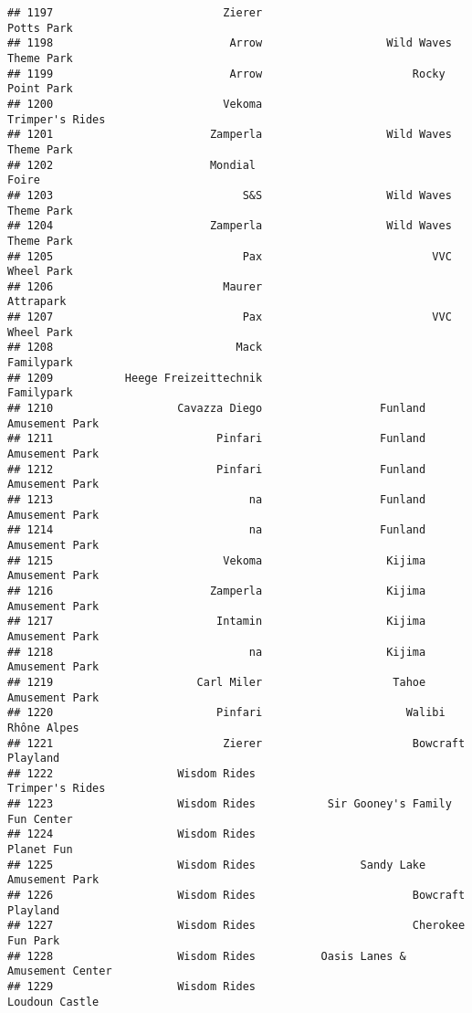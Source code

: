 \documentclass[
]{article}
\begin{document}
\begin{verbatim}
## 1197                          Zierer                              Potts Park
## 1198                           Arrow                   Wild Waves Theme Park
## 1199                           Arrow                       Rocky Point Park 
## 1200                          Vekoma                         Trimper's Rides
## 1201                        Zamperla                   Wild Waves Theme Park
## 1202                        Mondial                                    Foire
## 1203                             S&S                   Wild Waves Theme Park
## 1204                        Zamperla                   Wild Waves Theme Park
## 1205                             Pax                          VVC Wheel Park
## 1206                          Maurer                               Attrapark
## 1207                             Pax                          VVC Wheel Park
## 1208                            Mack                              Familypark
## 1209           Heege Freizeittechnik                              Familypark
## 1210                   Cavazza Diego                  Funland Amusement Park
## 1211                         Pinfari                  Funland Amusement Park
## 1212                         Pinfari                  Funland Amusement Park
## 1213                              na                  Funland Amusement Park
## 1214                              na                  Funland Amusement Park
## 1215                          Vekoma                   Kijima Amusement Park
## 1216                        Zamperla                   Kijima Amusement Park
## 1217                         Intamin                   Kijima Amusement Park
## 1218                              na                   Kijima Amusement Park
## 1219                      Carl Miler                    Tahoe Amusement Park
## 1220                         Pinfari                      Walibi Rhône Alpes
## 1221                          Zierer                       Bowcraft Playland
## 1222                   Wisdom Rides                          Trimper's Rides
## 1223                   Wisdom Rides           Sir Gooney's Family Fun Center
## 1224                   Wisdom Rides                               Planet Fun
## 1225                   Wisdom Rides                Sandy Lake Amusement Park
## 1226                   Wisdom Rides                        Bowcraft Playland
## 1227                   Wisdom Rides                        Cherokee Fun Park
## 1228                   Wisdom Rides          Oasis Lanes & Amusement Center 
## 1229                   Wisdom Rides                           Loudoun Castle

\end{verbatim}
\end{document}
